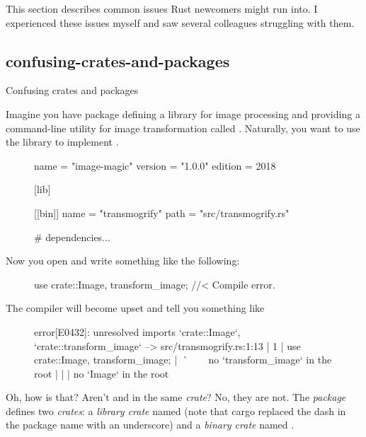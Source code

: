 \documentclass{article}
\begin{document}
This section describes common issues Rust newcomers might run into.
I experienced these issues myself and saw several colleagues struggling with them.

\subsection{confusing-crates-and-packages}{Confusing crates and packages}

Imagine you have package  defining a library for image processing and providing a command-line utility for image transformation called .
Naturally, you want to use the library to implement .

\begin{figure}
\begin{code}[good]
[package]
name = "image-magic"
version = "1.0.0"
edition = 2018

[lib]

[[bin]]
name = "transmogrify"
path = "src/transmogrify.rs"

# dependencies...
\end{code}
\end{figure}


Now you open  and write something like the following:

\begin{figure}
\begin{code}[bad]
use crate::{Image, transform_image}; //< Compile error.
\end{code}
\end{figure}

The compiler will become upset and tell you something like

\begin{figure}
    \begin{code}[bad]
error[E0432]: unresolved imports `crate::Image`, `crate::transform_image`
 --> src/transmogrify.rs:1:13
  |
1 | use crate::{Image, transform_image};
  |             ^^^^^  ^^^^^^^^^^^^^^^ no `transform_image` in the root
  |             |
  |             no `Image` in the root
\end{code}
\end{figure}


Oh, how is that?
Aren't  and  in the same \emph{crate}?
No, they are not.
The  \emph{package} defines two \emph{crates}: a \emph{library crate} named  (note that cargo replaced the dash in the package name with an underscore) and a \emph{binary crate} named .
\end{document}
